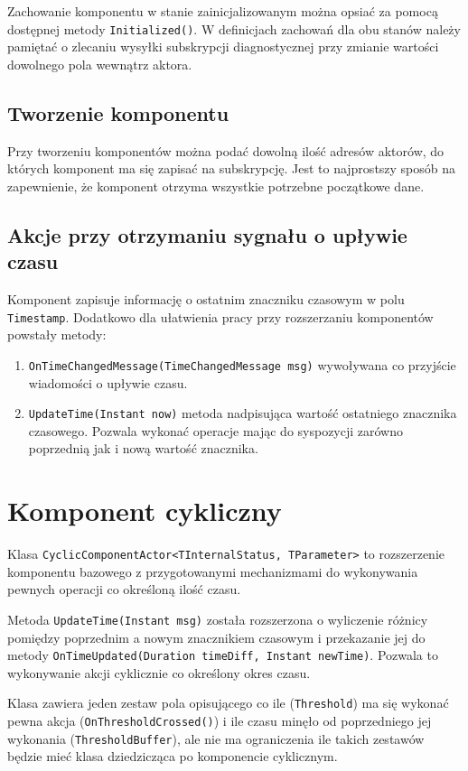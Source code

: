 Zachowanie komponentu w stanie zainicjalizowanym można opsiać za pomocą dostępnej metody \lstinline{Initialized()}. 
W definicjach zachowań dla obu stanów należy pamiętać o zlecaniu wysyłki subskrypcji diagnostycznej przy zmianie wartości dowolnego pola wewnątrz aktora.

\subsection*{Tworzenie komponentu}
Przy tworzeniu komponentów można podać dowolną ilość adresów aktorów, do których komponent ma się zapisać na subskrypcję. Jest to najprostszy sposób na zapewnienie, że komponent otrzyma wszystkie potrzebne początkowe dane. 

\subsection*{Akcje przy otrzymaniu sygnału o upływie czasu}
Komponent zapisuje informację o ostatnim znaczniku czasowym w polu \lstinline{Timestamp}. Dodatkowo dla ułatwienia pracy przy rozszerzaniu komponentów powstały metody:
\begin{enumerate} 
    \item \lstinline{OnTimeChangedMessage(TimeChangedMessage msg)} wywoływana co przyjście wiadomości o upływie czasu.
    \item \lstinline{UpdateTime(Instant now)} metoda nadpisująca wartość ostatniego znacznika czasowego. Pozwala wykonać operacje mając do syspozycji zarówno poprzednią jak i nową wartość znacznika. 
\end{enumerate}

\section{Komponent cykliczny}
Klasa \lstinline{CyclicComponentActor<TInternalStatus, TParameter>} to rozszerzenie komponentu bazowego z przygotowanymi mechanizmami do wykonywania pewnych operacji co określoną ilość czasu. 

Metoda \lstinline{UpdateTime(Instant msg)} została rozszerzona o wyliczenie różnicy pomiędzy poprzednim a nowym znacznikiem czasowym i przekazanie jej do metody \lstinline{OnTimeUpdated(Duration timeDiff, Instant newTime)}. Pozwala to wykonywanie akcji cyklicznie co określony okres czasu. 

Klasa zawiera jeden zestaw pola opisującego co ile (\lstinline{Threshold}) ma się wykonać pewna akcja (\lstinline{OnThresholdCrossed()}) i ile czasu minęło od poprzedniego jej wykonania (\lstinline{ThresholdBuffer}), ale nie ma ograniczenia ile takich zestawów będzie mieć klasa dziedzicząca po komponencie cyklicznym.

